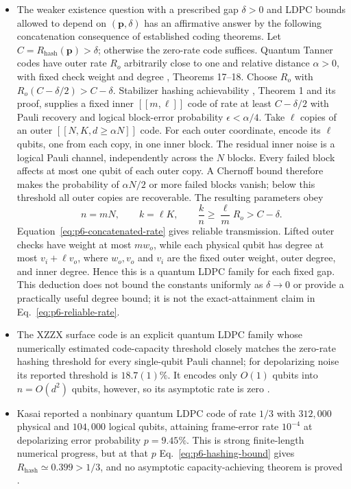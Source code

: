 \begin{itemize}
  \item The weaker existence question with a prescribed gap $\delta>0$ and
LDPC bounds allowed to depend on $(\mathbf p,\delta)$ has an affirmative
answer by the following concatenation consequence of established coding
theorems. Let $C=R_{\mathrm{hash}}(\mathbf p)>\delta$; otherwise the zero-rate
code suffices. Quantum Tanner codes have outer rate $R_o$ arbitrarily close
to one and relative distance $\alpha>0$, with fixed check weight and degree
, Theorems 17--18. Choose $R_o$ with
$R_o(C-\delta/2)>C-\delta$. Stabilizer hashing achievability
, Theorem 1 and its proof, supplies a fixed
inner $[[m,\ell]]$ code of rate at least $C-\delta/2$ with Pauli recovery and
logical block-error probability $\epsilon<\alpha/4$. Take $\ell$ copies of
an outer $[[N,K,d\ge\alpha N]]$ code. For each outer coordinate, encode its
$\ell$ qubits, one from each copy, in one inner block. The residual inner
noise is a logical Pauli channel, independently across the $N$ blocks.
Every failed block affects at most one qubit of each outer copy. A Chernoff
bound therefore makes the probability of $\alpha N/2$ or more failed
blocks vanish; below this threshold all outer copies are recoverable.
The resulting parameters obey
\begin{equation}
  n=mN,\qquad k=\ell K,\qquad
  \frac{k}{n}\ge\frac\ell m R_o>C-\delta.
  \label{eq:p6-concatenated-rate}
\end{equation}
Equation~\eqref{eq:p6-concatenated-rate} gives reliable transmission.
Lifted outer checks have weight at most $m w_o$, while each physical qubit
has degree at most $v_i+\ell v_o$, where $w_o,v_o$ and $v_i$ are the fixed
outer weight, outer degree, and inner degree. Hence this is a quantum LDPC
family for each fixed gap. This deduction does not bound the constants
uniformly as $\delta\to0$ or provide a practically useful degree bound;
it is not the exact-attainment claim in Eq.~\eqref{eq:p6-reliable-rate}.

  \item The XZZX surface code is an explicit quantum LDPC family whose
  numerically estimated code-capacity threshold closely matches the zero-rate
  hashing threshold for every single-qubit Pauli channel; for depolarizing
  noise its reported threshold is $18.7(1)\%$.  It encodes only $O(1)$ qubits
  into $n=O(d^2)$ qubits, however, so its asymptotic rate is zero
  .

  \item Kasai reported a nonbinary quantum LDPC code of rate $1/3$ with
  $312{,}000$ physical and $104{,}000$ logical qubits, attaining frame-error
  rate $10^{-4}$ at depolarizing error probability $p=9.45\%$.  This is strong
  finite-length numerical progress, but at that $p$ Eq.~\eqref{eq:p6-hashing-bound}
  gives $R_{\mathrm{hash}}\simeq0.399>1/3$, and no asymptotic
  capacity-achieving theorem is proved
  .


\end{itemize}
